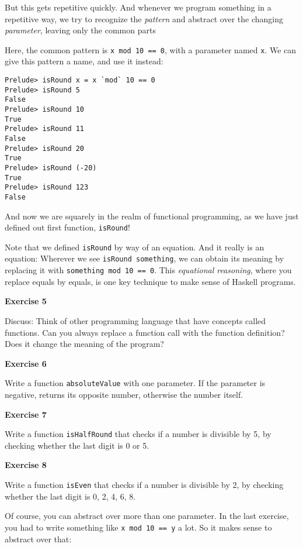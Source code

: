 \documentclass[11pt,
  american,
  DIV13]{article}
\begin{document}
But this gets repetitive quickly. And whenever we program something in a
repetitive way, we try to recognize the \emph{pattern} and abstract over
the changing \emph{parameter}, leaving only the common parts

Here, the common pattern is
\texttt{x\ \textasciigrave{}mod\textasciigrave{}\ 10\ ==\ 0}, with a
parameter named \texttt{x}. We can give this pattern a name, and use it
instead:

\begin{verbatim}
Prelude> isRound x = x `mod` 10 == 0
Prelude> isRound 5
False
Prelude> isRound 10
True
Prelude> isRound 11
False
Prelude> isRound 20
True
Prelude> isRound (-20)
True
Prelude> isRound 123
False
\end{verbatim}

And now we are squarely in the realm of functional programming, as we
have just defined out first function, \texttt{isRound}!

Note that we defined \texttt{isRound} by way of an equation. And it
really is an equation: Wherever we see \texttt{isRound\ something}, we
can obtain its meaning by replacing it with
\texttt{something\ \textasciigrave{}mod\textasciigrave{}\ 10\ ==\ 0}.
This \emph{equational reasoning}, where you replace equals by equals, is
one key technique to make sense of Haskell programs.

\textbf{Exercise 5}

Discuss: Think of other programming language that have concepts called
functions. Can you always replace a function call with the function
definition? Does it change the meaning of the program?

\textbf{Exercise 6}

Write a function \texttt{absoluteValue} with one parameter. If the
parameter is negative, returns its opposite number, otherwise the number
itself.

\textbf{Exercise 7}

Write a function \texttt{isHalfRound} that checks if a number is
divisible by 5, by checking whether the last digit is 0 or 5.

\textbf{Exercise 8}

Write a function \texttt{isEven} that checks if a number is divisible by
2, by checking whether the last digit is 0, 2, 4, 6, 8.

Of course, you can abstract over more than one parameter. In the last
exercise, you had to write something like
\texttt{x\ \textasciigrave{}mod\textasciigrave{}\ 10\ ==\ y} a lot. So
it makes sense to abstract over that:
\end{document}
